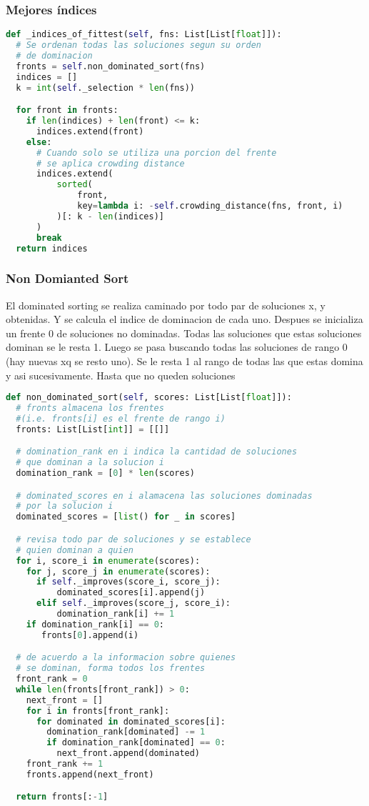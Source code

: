 \subsubsection{Mejores \'indices}
\begin{lstlisting}[language=Python]
def _indices_of_fittest(self, fns: List[List[float]]):
  # Se ordenan todas las soluciones segun su orden
  # de dominacion
  fronts = self.non_dominated_sort(fns)
  indices = []
  k = int(self._selection * len(fns))

  for front in fronts:
    if len(indices) + len(front) <= k:
      indices.extend(front)
    else:
      # Cuando solo se utiliza una porcion del frente
      # se aplica crowding distance
      indices.extend(
          sorted(
              front,
              key=lambda i: -self.crowding_distance(fns, front, i)
          )[: k - len(indices)]
      )
      break
  return indices
\end{lstlisting}

\subsubsection{Non Domianted Sort}
El dominated sorting se realiza caminado por todo par de soluciones x, y obtenidas. Y se calcula el indice de dominacion de cada uno. Despues se inicializa un frente 0 de soluciones no dominadas. Todas las soluciones que estas soluciones dominan se le resta 1. Luego se pasa buscando todas las soluciones de rango 0 (hay nuevas xq se resto uno). Se le resta 1 al rango de todas las que estas domina y asi sucesivamente. Hasta que no queden soluciones

\begin{lstlisting}[language=Python]
def non_dominated_sort(self, scores: List[List[float]]):
  # fronts almacena los frentes 
  #(i.e. fronts[i] es el frente de rango i)
  fronts: List[List[int]] = [[]]

  # domination_rank en i indica la cantidad de soluciones
  # que dominan a la solucion i
  domination_rank = [0] * len(scores)

  # dominated_scores en i alamacena las soluciones dominadas
  # por la solucion i
  dominated_scores = [list() for _ in scores]

  # revisa todo par de soluciones y se establece
  # quien dominan a quien
  for i, score_i in enumerate(scores):
    for j, score_j in enumerate(scores):
      if self._improves(score_i, score_j):
          dominated_scores[i].append(j)
      elif self._improves(score_j, score_i):
          domination_rank[i] += 1
    if domination_rank[i] == 0:
       fronts[0].append(i)

  # de acuerdo a la informacion sobre quienes
  # se dominan, forma todos los frentes
  front_rank = 0
  while len(fronts[front_rank]) > 0:
    next_front = []
    for i in fronts[front_rank]:
      for dominated in dominated_scores[i]:
        domination_rank[dominated] -= 1
        if domination_rank[dominated] == 0:
          next_front.append(dominated)
    front_rank += 1
    fronts.append(next_front)

  return fronts[:-1]
\end{lstlisting}

